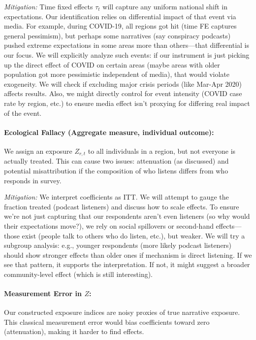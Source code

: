 \documentclass[12pt]{article}
\begin{document}
\textit{Mitigation:} Time fixed effects $\tau_t$ will capture any uniform national shift in expectations. Our identification relies on differential impact of that event via media. For example, during COVID-19, all regions got hit (time FE captures general pessimism), but perhaps some narratives (say conspiracy podcasts) pushed extreme expectations in some areas more than others—that differential is our focus. We will explicitly analyze such events: if our instrument is just picking up the direct effect of COVID on certain areas (maybe areas with older population got more pessimistic independent of media), that would violate exogeneity. We will check if excluding major crisis periods (like Mar-Apr 2020) affects results. Also, we might directly control for event intensity (COVID case rate by region, etc.) to ensure media effect isn't proxying for differing real impact of the event.

\paragraph{Ecological Fallacy (Aggregate measure, individual outcome):} We assign an exposure $Z_{r,t}$ to all individuals in a region, but not everyone is actually treated. This can cause two issues: attenuation (as discussed) and potential misattribution if the composition of who listens differs from who responds in survey.

\textit{Mitigation:} We interpret coefficients as ITT. We will attempt to gauge the fraction treated (podcast listeners) and discuss how to scale effects. To ensure we're not just capturing that our respondents aren't even listeners (so why would their expectations move?), we rely on social spillovers or second-hand effects—those exist (people talk to others who do listen, etc.), but weaker. We will try a subgroup analysis: e.g., younger respondents (more likely podcast listeners) should show stronger effects than older ones if mechanism is direct listening. If we see that pattern, it supports the interpretation. If not, it might suggest a broader community-level effect (which is still interesting).

\paragraph{Measurement Error in $Z$:} Our constructed exposure indices are noisy proxies of true narrative exposure. This classical measurement error would bias coefficients toward zero (attenuation), making it harder to find effects.
\end{document}
